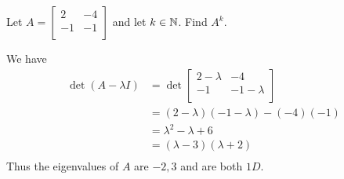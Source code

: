 \documentclass{article}
\begin{document}
    \begin{example}
      Let $A =
      \begin{bmatrix}
        2 & -4\\
        -1 & -1\\
      \end{bmatrix}$ and let $k \in \mathbb{N}$. Find $A^k$.

      We have
      \begin{align*}
        \det (A - \lambda I) &= \det
        \begin{bmatrix}
          2 - \lambda & -4 \\
          -1 & -1 - \lambda\\
        \end{bmatrix}\\
        &= (2 - \lambda)(-1 - \lambda) - (-4)(-1)\\
        &= \lambda^2 - \lambda + 6\\
        &= (\lambda - 3)(\lambda + 2)\\
      \end{align*}
      Thus the eigenvalues of $A$ are $-2, 3$ and are both $1D$.


\end{example}
\end{document}
